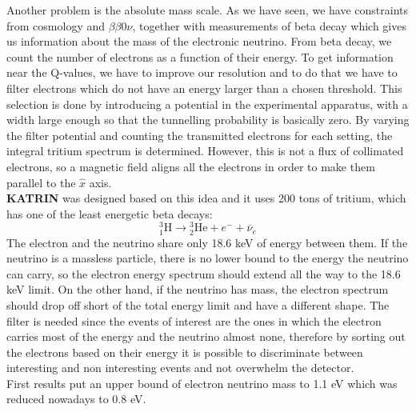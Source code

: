 \documentclass[10.75pt,a4paper,openright,bottom=2cm]{article}
\begin{document}
Another problem is the absolute mass scale. As we have seen, we have constraints from cosmology and $\beta\beta0\nu$, together with measurements of beta decay which gives us information about the mass of the electronic neutrino. From beta decay, we count the number of electrons as a function of their energy. To get information near the Q-values, we have to improve our resolution and to do that we have to filter electrons which do not have an energy larger than a chosen threshold. This selection is done by introducing a potential in the experimental apparatus, with a width large enough so that the tunnelling probability is basically zero. By varying the filter potential and counting the transmitted electrons for each setting, the integral tritium spectrum is determined. However, this is not a flux of collimated electrons, so a magnetic field aligns all the electrons in order to make them parallel to the $\hat{x}$ axis.\\ \textbf{KATRIN} was designed based on this idea and it uses 200 tons of tritium, which has one of the least energetic beta decays:
\[
\text{$^3_1$H}\to\text{$^3_2$He}+e^-+\overline{\nu}_e
\]
The electron and the neutrino share only 18.6 keV of energy between them.  If the neutrino is a massless particle, there is no lower bound to the energy the neutrino can carry, so the electron energy spectrum should extend all the way to the 18.6 keV limit. On the other hand, if the neutrino has mass, the electron spectrum should drop off short of the total energy limit and have a different shape. The filter is needed since the events of interest are the ones in which the electron carries most of the energy and the neutrino almost none, therefore by sorting out the electrons based on their energy it is possible to discriminate between interesting and non interesting events and not overwhelm the detector.\\
First results put an upper bound of electron neutrino mass to 1.1 eV which was reduced nowadays to 0.8 eV. 
\end{document}
